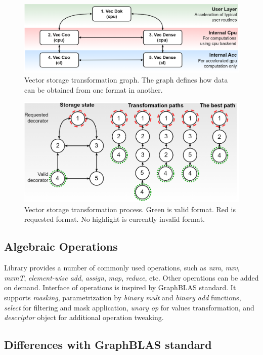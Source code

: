\begin{figure}[]
\centering
\includegraphics[width=0.8\linewidth]{figures/storage_transformation_graph.png}
\caption{Vector storage transformation graph. The graph defines how data can be obtained from one format in another.}
\label{fig:vec_tsf}
\end{figure}

\begin{figure}[]
\centering
\includegraphics[width=0.8\linewidth]{figures/storage_transformation.png}
\caption{Vector storage transformation process. Green is valid format. Red is requested format. No highlight is currently invalid format.}
\label{fig:vec_exmp}
\end{figure}

\subsection{Algebraic Operations}

Library provides a number of commonly used operations, such as \textit{vxm}, \textit{mxv}, \textit{mxmT}, \textit{element-wise add}, \textit{assign}, \textit{map}, \textit{reduce}, etc.
Other operations can be added on demand.
Interface of operations is inspired by GraphBLAS standard. 
It supports \textit{masking}, parametrization by \textit{binary mult} and \textit{binary add} functions, \textit{select} for filtering and mask application, \textit{unary op} for values transformation, and \textit{descriptor} object for additional operation tweaking.

\subsection{Differences with GraphBLAS standard}

